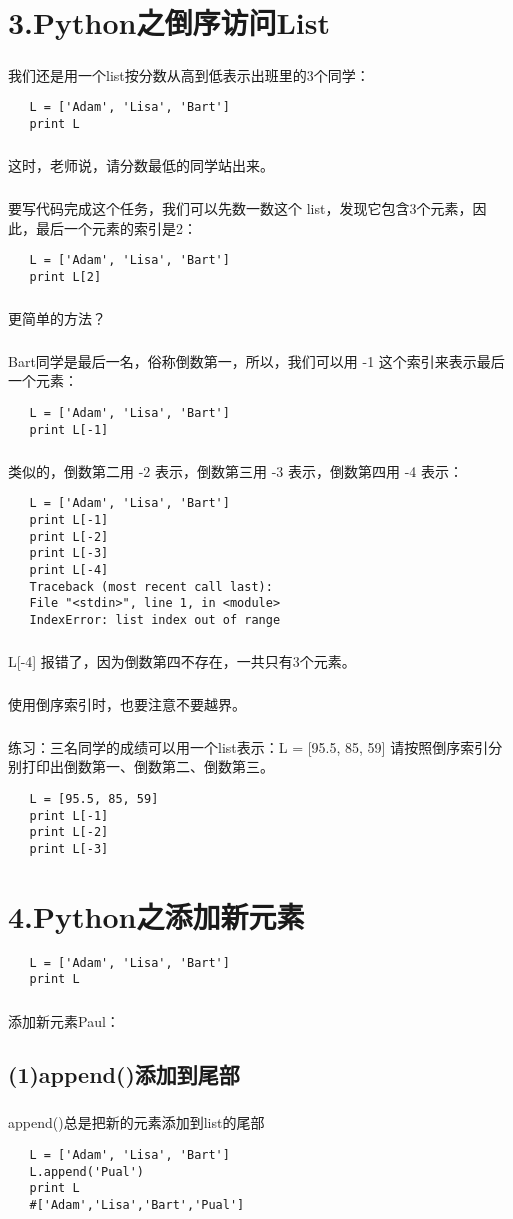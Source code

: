 \documentclass{article}
\begin{document}
\begin{CJK}{UTF8}{gbsn}
\section*{3.Python之倒序访问List}
\subparagraph*{}
我们还是用一个list按分数从高到低表示出班里的3个同学：
\begin{verbatim}
   L = ['Adam', 'Lisa', 'Bart']
   print L
\end{verbatim}
\subparagraph*{}
这时，老师说，请分数最低的同学站出来。
\subparagraph*{}
要写代码完成这个任务，我们可以先数一数这个 list，发现它包含3个元素，因此，最后一个元素的索引是2：
\begin{verbatim}
   L = ['Adam', 'Lisa', 'Bart']
   print L[2]
\end{verbatim}
\subparagraph*{}
更简单的方法？
\subparagraph*{}
Bart同学是最后一名，俗称倒数第一，所以，我们可以用 -1 这个索引来表示最后一个元素：
\begin{verbatim}
   L = ['Adam', 'Lisa', 'Bart']
   print L[-1]
\end{verbatim}
\subparagraph*{}
类似的，倒数第二用 -2 表示，倒数第三用 -3 表示，倒数第四用 -4 表示：
\begin{verbatim}
   L = ['Adam', 'Lisa', 'Bart']
   print L[-1]
   print L[-2]
   print L[-3]
   print L[-4]
   Traceback (most recent call last):
   File "<stdin>", line 1, in <module>
   IndexError: list index out of range
\end{verbatim}
\subparagraph*{}
L[-4] 报错了，因为倒数第四不存在，一共只有3个元素。
\subparagraph*{}
使用倒序索引时，也要注意不要越界。
\subparagraph*{}
练习：三名同学的成绩可以用一个list表示：L = [95.5, 85, 59]
请按照倒序索引分别打印出倒数第一、倒数第二、倒数第三。
\begin{verbatim}
   L = [95.5, 85, 59]
   print L[-1]
   print L[-2]
   print L[-3]
\end{verbatim}
\section*{4.Python之添加新元素}
\begin{verbatim}
   L = ['Adam', 'Lisa', 'Bart']
   print L
\end{verbatim}
\subparagraph*{}
添加新元素Paul：
\subsection*{(1)append()添加到尾部}
\subparagraph*{}
append()总是把新的元素添加到list的尾部
\begin{verbatim}
   L = ['Adam', 'Lisa', 'Bart']
   L.append('Pual')
   print L
   #['Adam','Lisa','Bart','Pual']
\end{verbatim}

\end{CJK}
\end{document}
